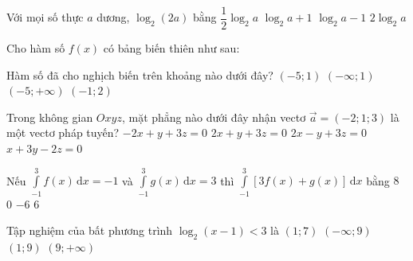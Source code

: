 \begin{ex}%
	Với mọi số thực $a$ dương, $\log _2(2a)$ bằng
	\choice 
	{$\dfrac{1}{2} \log _2 a$}
	{\True $\log _2 a+1$}
	{$\log _2 a-1$}
	{$2 \log _2 a$}
\end{ex}

\begin{ex}%
	Cho hàm số $f(x)$ có bảng biến thiên như sau:
	\begin{center}
	\end{center}
	Hàm số đã cho nghịch biến trên khoảng nào dưới đây?
	\choice 
	{$(-5 ; 1)$}
	{$(-\infty ; 1)$}
	{$(-5 ;+\infty)$}
	{\True $(-1 ; 2)$}
\end{ex}
\begin{ex}%
	Trong không gian $Oxyz$, mặt phẳng nào dưới đây nhận vectơ $\overrightarrow{a}=(-2 ; 1 ; 3)$ là một vectơ pháp tuyến?
	\choice 
	{\True $-2x+y+3z=0$}
	{$2x+y+3z=0$}
	{$2x-y+3z=0$}
	{$x+3y-2z=0$}
\end{ex}


\begin{ex}%
	Nếu $\displaystyle\int\limits_{-1}^{3} f(x) \mathrm{\,d}x=-1$ và $\displaystyle\int\limits_{-1}^{3} g(x) \mathrm{\,d}x=3$
	thì $\displaystyle\int\limits_{-1}^3 \left[ 3f(x)+g(x)\right] \mathrm{\,d}x$ bằng
	\choice
	{$8$}
	{\True $0$}
	{$-6$}
	{$6$}
\end{ex}

\begin{ex}%
	Tập nghiệm của bất phương trình $\log_{2}\left(x-1\right)<3$ là
	\choice
	{$\left(1;7\right)$}
	{$\left(-\infty;9\right)$}
	{\True $\left(1;9\right)$}
	{$\left(9;+\infty\right)$}
\end{ex}

